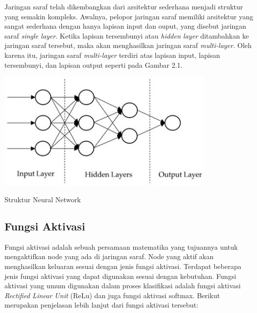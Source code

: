 Jaringan saraf telah dikembangkan dari arsitektur sederhana menjadi struktur yang semakin kompleks. Awalnya, pelopor jaringan saraf memiliki arsitektur yang sangat sederhana dengan hanya lapisan input dan ouput, yang disebut jaringan saraf \textit{single layer}. Ketika lapisan tersembunyi atau \textit{hidden layer} ditambahkan ke jaringan saraf tersebut, maka akan menghasilkan jaringan saraf \textit{multi-layer}. Oleh karena itu, jaringan saraf \textit{multi-layer} terdiri atas lapisan input, lapisan tersembunyi, dan lapisan output seperti pada Gambar 2.1.

\begin{afigure}
    \includegraphics[width=0.8\textwidth, center]{images/Picture1.jpg}
    \caption{Struktur Neural Network}
    \label{fig:neural-network} 
\end{afigure}

\subsection{Fungsi Aktivasi}
Fungsi aktivasi adalah sebuah persamaan matematika yang tujuannya untuk mengaktifkan node yang ada di jaringan saraf. Node yang aktif akan menghasilkan keluaran sesuai dengan jenis fungsi aktivasi. Terdapat beberapa jenis fungsi aktivasi yang dapat digunakan sesuai dengan kebutuhan. Fungsi aktivasi yang umum digunakan dalam proses klasifikasi adalah fungsi aktivasi \textit{Rectified Linear Unit} (ReLu) dan juga fungsi aktivasi softmax. Berikut merupakan penjelasan lebih lanjut dari fungsi aktivasi tersebut:

